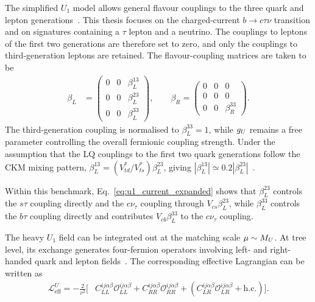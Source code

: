 The simplified $U_{1}$ model allows general flavour couplings to the three quark and lepton generations~\cite{Baker2019HighPTU1}. This thesis focuses on the charged-current $b\rightarrow c\tau\nu$ transition and on signatures containing a $\tau$ lepton and a neutrino. The couplings to leptons of the first two generations are therefore set to zero, and only the couplings to third-generation leptons are retained. The flavour-coupling matrices are taken to be
\begin{equation*}
    \begin{aligned}
        \beta_{L} &=
        \begin{pmatrix}
            0 & 0 & \beta_{L}^{13} \\
            0 & 0 & \beta_{L}^{23} \\
            0 & 0 & \beta_{L}^{33}
        \end{pmatrix},
        \qquad
        \beta_{R} =
        \begin{pmatrix}
            0 & 0 & 0 \\
            0 & 0 & 0 \\
            0 & 0 & \beta_{R}^{33}
        \end{pmatrix}.
    \end{aligned}
\end{equation*}
The third-generation coupling is normalised to $\beta_{L}^{33}=1$, while $g_U$ remains a free parameter controlling the overall fermionic coupling strength. Under the assumption that the LQ couplings to the first two quark generations follow the CKM mixing pattern, $\beta_L^{13}=(V_{td}^{*}/V_{ts}^{*})\beta_L^{23}$, giving $|\beta_L^{13}|\simeq0.2|\beta_L^{23}|$~\cite{Aebischer2022}.

Within this benchmark, Eq.~\eqref{eq:u1_current_expanded} shows that $\beta_{L}^{23}$ controls the $s\tau$ coupling directly and the $c\nu_\tau$ coupling through $V_{cs}\beta_L^{23}$, while $\beta_L^{33}$ controls the $b\tau$ coupling directly and contributes $V_{cb}\beta_L^{33}$ to the $c\nu_\tau$ coupling.


The heavy $U_{1}$ field can be integrated out at the matching scale $\mu\sim M_U$.
At tree level, its exchange generates four-fermion operators involving left- and right-handed quark and lepton fields~\cite{Aebischer2022}. The corresponding effective Lagrangian can be written as
\begin{align}
\mathcal{L}_{\mathrm{eff}}^{U}
=
-\frac{2}{v^{2}}
\bigg[
& C_{LL}^{ij\alpha\beta}
\mathcal{O}_{LL}^{ij\alpha\beta}
+
C_{RR}^{ij\alpha\beta}
\mathcal{O}_{RR}^{ij\alpha\beta}
+
\left(
C_{LR}^{ij\alpha\beta}
\mathcal{O}_{LR}^{ij\alpha\beta}
+
\mathrm{h.c.}
\right)
\bigg].
\label{eq:u1_low_energy_effective_lagrangian}
\end{align}

